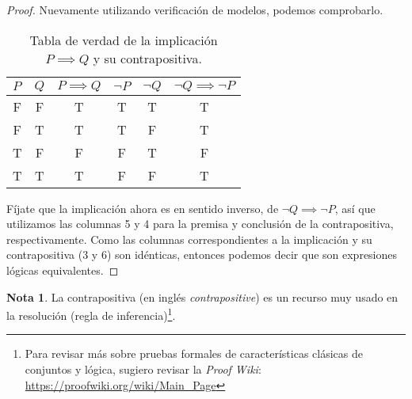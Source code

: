 \documentclass[]{book}
\theoremstyle{definition}
\newtheorem*{rmk}{Nota}
\begin{document}
\begin{proof}
    Nuevamente utilizando verificación de modelos, podemos comprobarlo.

    \begin{table}[htbp]
        \centering
        \caption{Tabla de verdad de la implicación $P \implies Q$ y su contrapositiva.}
        \label{tab:contrapositive}
        \begin{tabular}{@{}cccccc@{}}
        \toprule
        \multicolumn{1}{l}{$P$} & \multicolumn{1}{l}{$Q$} & \multicolumn{1}{l}{$P \implies Q$} & \multicolumn{1}{l}{$\neg P$} & \multicolumn{1}{l}{$\neg Q$} & \multicolumn{1}{l}{$\neg Q \implies \neg P$} \\ \midrule
        F & F & T & T & T & T \\
        F & T & T & T & F & T \\
        T & F & F & F & T & F \\
        T & T & T & F & F & T \\ \bottomrule
        \end{tabular}
    \end{table}

    Fíjate que la implicación ahora es en sentido inverso, de $\neg Q \implies \neg P$, así que utilizamos las columnas 5 y 4 para la premisa y conclusión de la contrapositiva, respectivamente.
    Como las columnas correspondientes a la implicación y su contrapositiva (3 y 6) son idénticas, entonces podemos decir que son expresiones lógicas equivalentes.
\end{proof}

\begin{rmk}
    La contrapositiva (en inglés \textit{contrapositive}) es un recurso muy usado en la resolución (regla de inferencia)\footnote{Para revisar más sobre pruebas formales de características clásicas de conjuntos y lógica, sugiero revisar la \textit{Proof Wiki}: \url{https://proofwiki.org/wiki/Main_Page}}.
\end{rmk}
\end{document}
